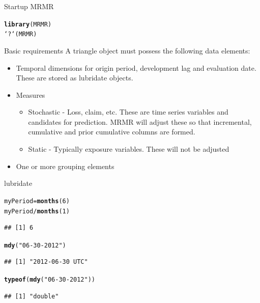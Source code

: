 \documentclass[xcolor=dvipsnames]{beamer}\usepackage{graphicx, color}
\makeatletter
\newcommand{\hlfunctioncall}[1]{\textcolor[rgb]{0.501960784313725,0,0.329411764705882}{\textbf{#1}}}%
\newcommand{\hlstring}[1]{\textcolor[rgb]{0.6,0.6,1}{#1}}%
\newenvironment{kframe}{%
 \def\at@end@of@kframe{}%
 \ifinner\ifhmode%
  \def\at@end@of@kframe{\end{minipage}}%
  \begin{minipage}{\columnwidth}%
 \fi\fi%
 \def\FrameCommand##1{\hskip\@totalleftmargin \hskip-\fboxsep
 \colorbox{shadecolor}{##1}\hskip-\fboxsep
     \hskip-\linewidth \hskip-\@totalleftmargin \hskip\columnwidth}%
 \MakeFramed {\advance\hsize-\width
   \@totalleftmargin\z@ \linewidth\hsize
   \@setminipage}}%
 {\par\unskip\endMakeFramed%
 \at@end@of@kframe}
\newenvironment{knitrout}{}{} %
\makeatother
\begin{document}
\begin{frame}[fragile]{Startup MRMR}
\begin{knitrout}
\color{fgcolor}\begin{kframe}
\begin{alltt}
\hlfunctioncall{library}(MRMR)
`?`(MRMR)
\end{alltt}
\end{kframe}
\end{knitrout}

\end{frame}

\begin{frame}{Basic requirements}
  A triangle object must possess the following data elements:
  \begin{itemize}
    \item Temporal dimensions for origin period, development lag and evaluation date. These are stored as lubridate objects.
    \item Measures
      \begin{itemize}
        \item Stochastic - Loss, claim, etc. These are time series variables and candidates for prediction. MRMR will adjust these so that incremental, cumulative and prior cumulative columns are formed.
        \item Static - Typically exposure variables. These will not be adjusted
      \end{itemize}
    \item One or more grouping elements
  \end{itemize}
\end{frame}

\begin{frame}[fragile]{lubridate}
\begin{knitrout}
\color{fgcolor}\begin{kframe}
\begin{alltt}
myPeriod = \hlfunctioncall{months}(6)
myPeriod/\hlfunctioncall{months}(1)
\end{alltt}


{\ttfamily\noindent\itshape\color{messagecolor}{\#\# estimate only: convert to intervals for accuracy}}\begin{verbatim}
## [1] 6
\end{verbatim}
\begin{alltt}
\hlfunctioncall{mdy}(\hlstring{"06-30-2012"})
\end{alltt}
\begin{verbatim}
## [1] "2012-06-30 UTC"
\end{verbatim}
\begin{alltt}
\hlfunctioncall{typeof}(\hlfunctioncall{mdy}(\hlstring{"06-30-2012"}))
\end{alltt}
\begin{verbatim}
## [1] "double"
\end{verbatim}
\end{kframe}
\end{knitrout}

\end{frame}
\end{document}
